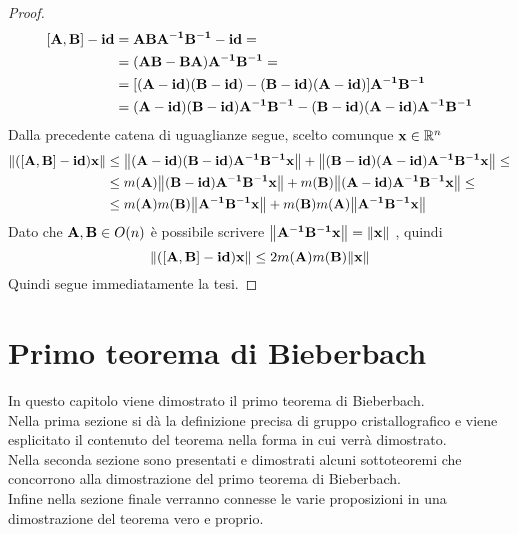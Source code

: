 \documentclass[a4paper]{book}
\begin{document}
\begin{proof}
\begin{equation*}
\begin{split}
[\vb{A,B}] - \vb{id} & = \vb{ABA^{-1}B^{-1} - id } = \\
& = \vb{(AB -BA)A^{-1}B^{-1} } = \\
& = [ \vb{ (A-id)(B-id) - (B-id)(A-id)}] \vb{A^{-1}B^{-1}} \\
& = \vb{( A-id)(B-id) A^{-1}B^{-1} -  (B-id)(A-id) A^{-1}B^{-1}}
\end{split}
\end{equation*}  
Dalla precedente catena di uguaglianze segue, scelto comunque $\vb{x} \in \mathbb{R}^n $
 \begin{equation*} 
\begin{split}
\norm{\vb{([A,B] - id )x}} & \leq \norm{\vb{ ( A-id)(B-id) A^{-1}B^{-1}x}} +  \norm{\vb{(B-id)(A-id) A^{-1}B^{-1}x}} \leq \\
& \leq m(\vb{A}) \norm{\vb{(B-id) A^{-1}B^{-1}x}} + m(\vb{B}) \norm{\vb{(A-id) A^{-1}B^{-1}x}} \leq \\ 
& \leq m(\vb{A})m(\vb{B})\norm{\vb{A^{-1}B^{-1}x}} + m(\vb{B})m(\vb{A}) \norm{\vb{A^{-1}B^{-1}x}}
\end{split}
\end{equation*}
Dato che $ \vb{A,B} \in O(n)$ è possibile scrivere $\norm{\vb{A^{-1}B^{-1}x}} = \norm{\vb{x}} $ , quindi 
\begin{equation*}
  \norm{\vb{([A,B] - id )x}}  \leq 2m(\vb{A})m(\vb{B})\norm{\vb{x}}
\end{equation*} 
Quindi segue immediatamente la tesi. 
\end{proof}

\chapter{Primo teorema di Bieberbach}
In questo capitolo viene dimostrato il primo teorema di Bieberbach. \\
Nella prima sezione si dà la definizione precisa di gruppo cristallografico e viene esplicitato il contenuto del teorema nella forma in cui verrà dimostrato. \\
Nella seconda sezione sono presentati e dimostrati alcuni sottoteoremi che concorrono alla dimostrazione del primo teorema di Bieberbach. \\ 
Infine nella sezione finale verranno connesse le varie proposizioni in una dimostrazione del teorema vero e proprio.  \\
\end{document}
